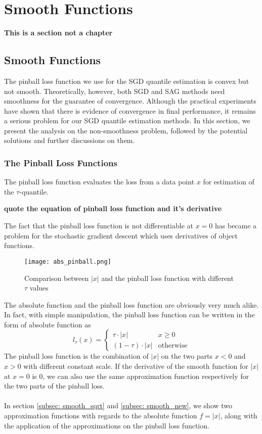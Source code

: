 \chapter{Smooth Functions}
\label{ch: smooth_func}

\graphicspath{{Figures/Smooth_func/}{./}} 
\textbf{This is a section not a chapter}


\section{Smooth Functions}
The pinball loss function we use for the SGD quantile estimation is convex but not smooth. 
Theoretically, however, both SGD and SAG methods need smoothness for the guarantee of convergence. Although the practical experiments have shown that there is evidence of convergence in final performance, it remains a serious problem for our SGD quantile estimation methods. In this section, we present the analysis on the non-smoothness problem, followed by the potential solutions and further discussions on them.

\subsection{The Pinball Loss Functions}
The pinball loss function evaluates the loss from a data point $x$ for estimation of the $\tau$-quantile.

\textbf{quote the equation of pinball loss function and it's derivative}

The fact that the pinball loss function is not differentiable at $x= 0$ has became a problem for the stochastic gradient descent which uses derivatives of object functions.

\begin{figure*}[h!]
	\texttt{[image: abs\_pinball.png]}
	\caption{Comparison between $|x|$ and the pinball loss function with different $\tau$ values}
\end{figure*}

The absolute function and the pinball loss function are obviously very much alike. In fact, with simple manipulation, the pinball loss function can be written in the form of absolute function as 
\begin{equation}
    l_\tau(x) = 
    \begin{cases}
        \tau \cdot |x| & {x \geq 0} \\
        (1-\tau) \cdot |x| & \text{otherwise}
    \end{cases}
\end{equation}
The pinball loss function is the combination of $|x|$ on the two parts $x<0$ and $x>0$ with different constant scale. 
If the derivative of the smooth function for $|x|$ at $x=0$ is $0$, we can also use the same approximation function respectively for the two parts of the pinball loss.
\\\\
In section \ref{subsec: smooth_sqrt} and \ref{subsec: smooth_new}, we show two approximation functions with regards to the absolute function $f = |x|$, along with the application of the approximations on the pinball loss function.

